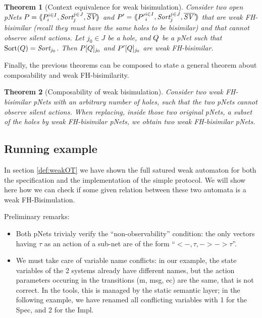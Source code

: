 \documentclass{lmcs}
\newtheorem{theorem}{Theorem}
\begin{document}
\begin{theorem}[Context equivalence for  weak bisimulation]\label{weak-thm-ctxt-eq}
	Consider two  open pNets
	$\pNet = \mylangle \pNet_i^{i\in I}, \Sort_j^{j\in J}, 
	\set{\symb{SV}}\myrangle$ and 	$\pNet' = \mylangle {\pNet'}_i^{i\in I}, 
	\Sort_j^{j\in 
	J}, 	\set{\symb{SV'}}\myrangle$ that are weak FH-bisimilar
	(recall they must have the same holes to be bisimilar) and that cannot observe silent actions.
	Let $j_0\in J$ be a hole, and $Q$ be a pNet such that $\Sortop(\pNetQ)=\Sort_{j_0}$. Then 
	$P[Q]_{j_0}$ and 
	$P'[Q]_{j_0}$ are weak FH-bisimilar.
\end{theorem}

Finally, the previous theorems can be composed to state a general theorem about 
composability and weak FH-bisimilarity.

\begin{theorem}[Composability of weak bisimulation]\label{weak-compos}
	Consider two weak FH-bisimilar pNets with an arbitrary number of holes, such that the two pNets cannot observe silent actions. When replacing, 
	inside those two original pNets, a subset of the holes by weak FH-bisimilar pNets, we 
	obtain two weak FH-bisimilar pNets.
\end{theorem}


\subsection{Running example}
In section \ref{def:weakOT} we have shown the full satured weak automaton for both the specification and the implementation of the simple protocol. We will show here how we can check if some given relation between these two automata is a weak FH-Bisimulation. 

\medskip
\noindent
Preliminary remarks:
  \begin{itemize}
    \item Both pNets trivialy verify the ``non-observability''
      condition: the only vectors having $\tau$ as an action of a
      sub-net are of the form ``$< -, \tau, -> -> \tau$''.
    \item We must take care of variable name conflicts: in our example, the state variables of the 2 systems already have different names, but the action parameters occuring in the transitions (m, msg, ec) are the same, that is not correct. In the tools, this is managed by the static semantic layer; in the following example, we have renamed all conflicting variables with 1 for the Spec, and 2 for the Impl.
    \end{itemize}
\end{document}
